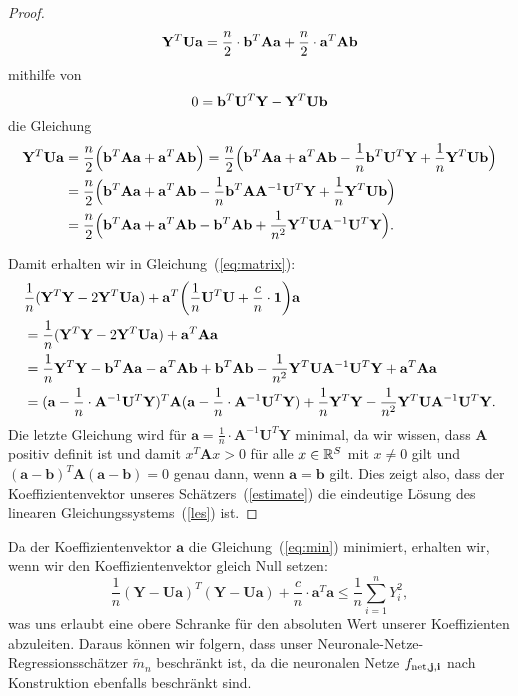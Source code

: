 \begin{proof}
$$ \mathbf{Y}^T\mathbf{U}\mathbf{a} = \frac{n}{2} \cdot \mathbf{b}^T\mathbf{A}\mathbf{a} + \frac{n}{2} \cdot \mathbf{a}^T\mathbf{A}\mathbf{b} $$
mithilfe von $$0 = \mathbf{b}^T\mathbf{U}^T\mathbf{Y} - \mathbf{Y}^T\mathbf{U}\mathbf{b}$$
die Gleichung 
\begin{equation}
\begin{split}
 \mathbf{Y}^T\mathbf{U}\mathbf{a} & = \frac{n}{2} \Big(\mathbf{b}^T\mathbf{A}\mathbf{a} + \mathbf{a}^T\mathbf{A}\mathbf{b}\Big) = \frac{n}{2}\Big( \mathbf{b}^T\mathbf{A}\mathbf{a} + \mathbf{a}^T\mathbf{A}\mathbf{b} - \frac{1}{n}\mathbf{b}^T\mathbf{U}^T\mathbf{Y} + \frac{1}{n}\mathbf{Y}^T\mathbf{U}\mathbf{b} \Big)\\
 & = \frac{n}{2} \Big( \mathbf{b}^T\mathbf{A}\mathbf{a} + \mathbf{a}^T\mathbf{A}\mathbf{b} - \frac{1}{n}\mathbf{b}^T\mathbf{A}\mathbf{A}^{-1}\mathbf{U}^T\mathbf{Y} + \frac{1}{n}\mathbf{Y}^T\mathbf{U}\mathbf{b} \Big)\\
& = \frac{n}{2} \Big(\mathbf{b}^T\mathbf{A}\mathbf{a} + \mathbf{a}^T\mathbf{A}\mathbf{b} - \mathbf{b}^T\mathbf{A}\mathbf{b} + \frac{1}{n^2}\mathbf{Y}^T\mathbf{U}\mathbf{A}^{-1}\mathbf{U}^T\mathbf{Y} \Big).
\end{split}
\end{equation}

Damit erhalten wir in Gleichung~(\ref{eq:matrix}):
\begin{equation*}
\begin{split}
& \frac{1}{n}(\mathbf{Y}^T\mathbf{Y} - 2\mathbf{Y}^T\mathbf{U}\mathbf{a}) + \mathbf{a}^T\bigg(\frac{1}{n} \mathbf{U}^T\mathbf{U} + \frac{c}{n} \cdot \mathbf{1}\bigg) \mathbf{a} \\
& = \frac{1}{n}(\mathbf{Y}^T\mathbf{Y} - 2\mathbf{Y}^T\mathbf{U}\mathbf{a}) + \mathbf{a}^T \mathbf{A} \mathbf{a} \\
& = \frac{1}{n}\mathbf{Y}^T\mathbf{Y} - \mathbf{b}^T\mathbf{A}\mathbf{a} - \mathbf{a}^T\mathbf{A}\mathbf{b} + \mathbf{b}^T\mathbf{A}\mathbf{b} - \frac{1}{n^2}\mathbf{Y}^T\mathbf{U}\mathbf{A}^{-1}\mathbf{U}^T\mathbf{Y} + \mathbf{a}^T\mathbf{A}\mathbf{a} \\
& = (\mathbf{a} - \frac{1}{n} \cdot \mathbf{A}^{-1}\mathbf{U}^T\mathbf{Y})^T \mathbf{A} (\mathbf{a} - \frac{1}{n} \cdot \mathbf{A}^{-1} \mathbf{U}^T\mathbf{Y}) + \frac{1}{n}\mathbf{Y}^T\mathbf{Y} - \frac{1}{n^2}\mathbf{Y}^T\mathbf{U}\mathbf{A}^{-1}\mathbf{U}^T\mathbf{Y}.
\end{split} 
\end{equation*} 
Die letzte Gleichung wird für $\mathbf{a} = \frac{1}{n} \cdot \mathbf{A}^{-1}\mathbf{U}^T\mathbf{Y}$ minimal, 
da wir wissen, dass $\mathbf{A}$ positiv definit ist und damit $x^T\mathbf{A}x > 0$ für alle $x \in \mathbb{R}^S$ mit $x \neq 0$ gilt und $(\mathbf{a} - \mathbf{b})^T\mathbf{A}(\mathbf{a} - \mathbf{b}) = 0$ genau dann, wenn $\mathbf{a} = \mathbf{b}$ gilt.
Dies zeigt also, dass der Koeffizientenvektor unseres Schätzers~(\ref{estimate}) die eindeutige Lösung des linearen Gleichungssystems~(\ref{les}) ist.
\end{proof}
\begin{bemnumber}
\label{mtildebeschraenkt}
Da der Koeffizientenvektor $\mathbf{a}$ die Gleichung~(\ref{eq:min}) minimiert, erhalten wir, wenn wir den Koeffizientenvektor gleich Null setzen:
$$\frac{1}{n}(\mathbf{Y} - \mathbf{U}\mathbf{a})^T(\mathbf{Y} - \mathbf{U}\mathbf{a}) + \frac{c}{n} \cdot \mathbf{a}^T\mathbf{a} \leq \frac{1}{n} \sum_{i = 1}^n Y_i^2,$$
was uns erlaubt eine obere Schranke für den absoluten Wert unserer Koeffizienten abzuleiten. Daraus können wir folgern, dass unser Neuronale-Netze-Regressionsschätzer $\tilde{m}_n$ beschränkt ist, da die neuronalen Netze $f_{\mathrm{net},\mathbf{j},\mathbf{i}}$ nach Konstruktion ebenfalls beschränkt sind.
\end{bemnumber}